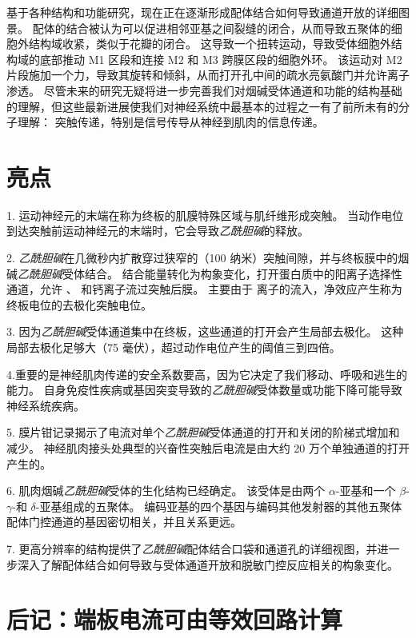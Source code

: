 基于各种结构和功能研究，现在正在逐渐形成配体结合如何导致通道开放的详细图景。
配体的结合被认为可以促进相邻亚基之间裂缝的闭合，从而导致五聚体的细胞外结构域收紧，类似于花瓣的闭合。
这导致一个扭转运动，导致受体细胞外结构域的底部推动 M1 区段和连接 M2 和 M3 跨膜区段的细胞外环。
该运动对 M2 片段施加一个力，导致其旋转和倾斜，从而打开孔中间的疏水亮氨酸门并允许离子渗透。
尽管未来的研究无疑将进一步完善我们对烟碱受体通道和功能的结构基础的理解，但这些最新进展使我们对神经系统中最基本的过程之一有了前所未有的分子理解：
突触传递，特别是信号传导从神经到肌肉的信息传递。



\section{亮点}

1. 运动神经元的末端在称为终板的肌膜特殊区域与肌纤维形成突触。
当动作电位到达突触前运动神经元的末端时，它会导致\textit{乙酰胆碱}的释放。 


2. \textit{乙酰胆碱}在几微秒内扩散穿过狭窄的（100 纳米）突触间隙，并与终板膜中的烟碱\textit{乙酰胆碱}受体结合。
结合能量转化为构象变化，打开蛋白质中的阳离子选择性通道，允许 、 和钙离子流过突触后膜。
主要由于  离子的流入，净效应产生称为终板电位的去极化突触电位。 


3. 因为\textit{乙酰胆碱}受体通道集中在终板，这些通道的打开会产生局部去极化。
这种局部去极化足够大（75 毫伏），超过动作电位产生的阈值三到四倍。 


4.重要的是神经肌肉传递的安全系数要高，因为它决定了我们移动、呼吸和逃生的能力。
自身免疫性疾病或基因突变导致的\textit{乙酰胆碱}受体数量或功能下降可能导致神经系统疾病。 


5. 膜片钳记录揭示了电流对单个\textit{乙酰胆碱}受体通道的打开和关闭的阶梯式增加和减少。
神经肌肉接头处典型的兴奋性突触后电流是由大约 20 万个单独通道的打开产生的。 


6. 肌肉烟碱\textit{乙酰胆碱}受体的生化结构已经确定。
该受体是由两个 $\alpha$-亚基和一个 $\beta$-$\gamma$-和 $\delta$-亚基组成的五聚体。
编码亚基的四个基因与编码其他发射器的其他五聚体配体门控通道的基因密切相关，并且关系更远。 


7. 更高分辨率的结构提供了\textit{乙酰胆碱}配体结合口袋和通道孔的详细视图，并进一步深入了解配体结合如何导致与受体通道开放和脱敏门控反应相关的构象变化。


\section{后记：端板电流可由等效回路计算}

